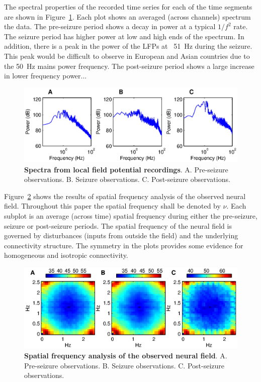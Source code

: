 \documentclass[]{article}
\begin{document}
The spectral properties of the recorded time series for each of the time segments are shown in Figure~\ref{fig:TemporalFreqObservation}. Each plot shows an averaged (across channels) spectrum the data. The pre-seizure period shows a decay in power at a typical $1/f^2$ rate. The seizure period has higher power at low and high ends of the spectrum. In addition, there is a peak in the power of the LFPs at ~51~Hz during the seizure. This peak would be difficult to observe in European and Asian countries due to the 50~Hz mains power frequency. The post-seizure period shows a large increase in lower frequency power...
 
\begin{figure}[!ht]
\begin{center}
\includegraphics{./Figures/TemporalFreq.eps}
\end{center}
\caption{{\bf Spectra from local field potential recordings}. A. Pre-seizure observations. B. Seizure observations. C. Post-seizure observations.}
\label{fig:TemporalFreqObservation}
\end{figure}

Figure~\ref{fig:SpatialFreqObservation} shows the results of spatial frequency analysis of the observed neural field. Throughout this paper the spatial frequency shall be denoted by $\nu$. Each subplot is an average (across time) spatial frequency during either the pre-seizure, seizure or post-seizure periods. The spatial frequency of the neural field is governed by disturbances (inputs from outside the field) and the underlying connectivity structure. The symmetry in the plots provides some evidence for homogeneous and isotropic connectivity.   

\begin{figure}[!ht]
\begin{center}
\includegraphics{./Figures/SpatialFreq.eps}
\end{center}
\caption{{\bf Spatial frequency analysis of the observed neural field}. A. Pre-seizure observations. B. Seizure observations. C. Post-seizure observations.}
\label{fig:SpatialFreqObservation}
\end{figure}
\end{document}
